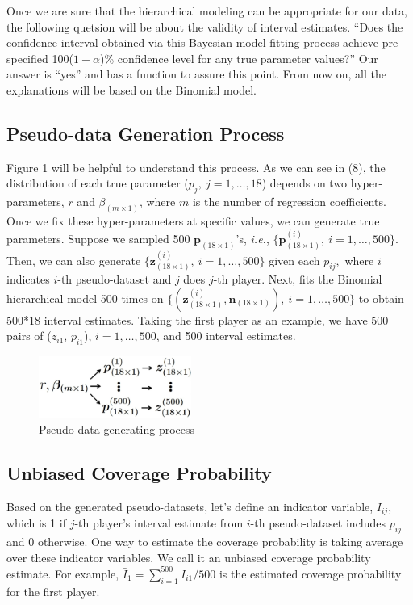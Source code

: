 \documentclass[article]{jss}
\begin{document}
Once we are sure that the hierarchical modeling can be appropriate for our data, the following quetsion will be about the validity of interval estimates. ``Does the confidence interval obtained via this Bayesian model-fitting process achieve pre-specified 100($1-\alpha$)\% confidence level for any true parameter values?'' Our answer is ``yes'' and  has a function to assure this point. From now on, all the explanations will be based on the Binomial model.

\subsection{Pseudo-data Generation Process}
Figure 1 will be helpful to understand this process. As we can see in (8), the distribution of each true parameter ($p_{j},~j=1,\ldots, 18$) depends on two hyper-parameters, $r$ and $\beta_{(m\times1)}$, where $m$ is the number of regression coefficients. Once we fix these hyper-parameters at specific values, we can generate true parameters. Suppose we sampled 500 $\textbf{p}_{(18\times1)}$'s, \emph{i.e.}, $\{\textbf{p}^{(i)}_{(18\times1)},~i=1, \ldots, 500\}$. Then, we can also generate $\{\textbf{z}^{(i)}_{(18\times1)},~i=1, \ldots, 500\}$ given each $p_{ij},$ where $i$ indicates $i$-th pseudo-dataset and $j$ does $j$-th player. Next,  fits the Binomial hierarchical model 500 times on $\{(\textbf{z}^{(i)}_{(18\times1)}, \textbf{n}_{(18 \times 1)}),~i=1, \ldots, 500\}$ to obtain 500*18 interval estimates. Taking the first player as an example, we have 500 pairs of ($z_{i1}$, $p_{i1}$), $i=1,\ldots, 500$, and 500 interval estimates.
\begin{figure}[h]
\begin{center}
\includegraphics[width=5cm]{process.png}
\caption{Pseudo-data generating process}
\end{center}
\end{figure}

\subsection{Unbiased Coverage Probability}
Based on the generated pseudo-datasets, let's define an indicator variable, $I_{ij}$, which is 1 if $j$-th player's interval estimate from $i$-th pseudo-dataset includes $p_{ij}$ and 0 otherwise. One way to estimate the coverage probability is taking average over these indicator variables. We call it an unbiased coverage probability estimate. For example, $\bar{I}_{1}=\sum_{i=1}^{500}I_{i1}/500$ is the estimated coverage probability for the first player.
\end{document}
